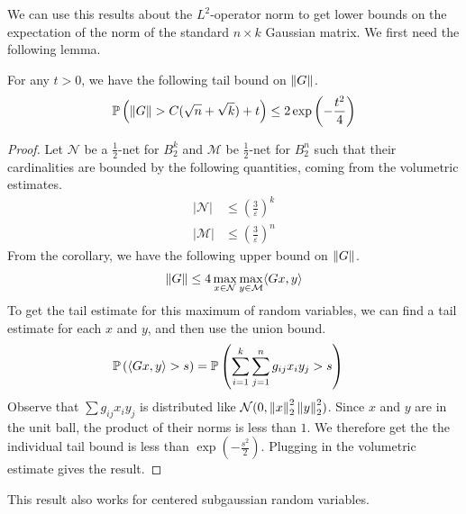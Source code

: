\documentclass[11pt]{article}
\begin{document}
We can use this results about the $L^2$-operator norm to get lower bounds on the expectation of the norm of the standard $n \times k$ Gaussian matrix.
We first need the following lemma.
\begin{lemma}
  For any $t > 0$, we have the following tail bound on $\norm{G}$.
  \begin{align*}
    \P\left( \norm{G} > C(\sqrt{n} + \sqrt{k}) + t \right) \leq 2 \exp\left( - \frac{t^2}{4} \right)
  \end{align*}
\end{lemma}
\begin{proof}
  Let $\mathcal{N}$ be a $\frac{1}{2}$-net for $B_2^k$ and $\mathcal{M}$ be $\frac{1}{2}$-net for $B_2^n$ such that their cardinalities are bounded by the following quantities, coming from the volumetric estimates.
  \begin{align*}
    |\mathcal{N}| &\leq \left( \frac{3}{\varepsilon} \right)^k \\
    |\mathcal{M}| &\leq \left( \frac{3}{\varepsilon} \right)^n
  \end{align*}
  From the corollary, we have the following upper bound on $\norm{G}$.
  \begin{align*}
    \norm{G} \leq 4 \max_{x \in \mathcal{N}} \max_{y \in \mathcal{M}} \langle Gx, y \rangle
  \end{align*}
  To get the tail estimate for this maximum of random variables, we can find a tail estimate for each $x$ and $y$, and then use the union bound.
  \begin{align*}
    \P\left( \langle Gx, y \rangle > s \right)
    &= \P \left( \sum_{i=1}^k  \sum_{j=1}^n g_{ij} x_i y_j > s\right)
  \end{align*}
  Observe that $\sum g_{ij} x_i y_j$ is distributed like $\mathcal{N}(0, \norm{x}_2^2 \norm{y}_2^2)$.
  Since $x$ and $y$ are in the unit ball, the product of their norms is less than $1$.
  We therefore get the the individual tail bound is less than $\exp\left( - \frac{s^2}{2} \right)$.
  Plugging in the volumetric estimate gives the result.
\end{proof}
\begin{remark}
  This result also works for centered subgaussian random variables.
\end{remark}

\printbibliography
\end{document}
